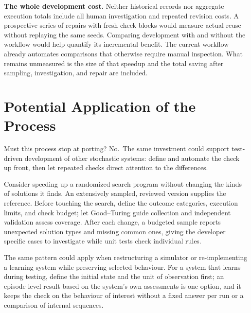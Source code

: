 \documentclass[10pt,letterpaper]{article}
\begin{document}
\textbf{The whole development cost.} Neither historical records nor aggregate execution
totals include all human investigation and repeated revision costs. A prospective series
of repairs with fresh check blocks would measure actual reuse without replaying the same
seeds. Comparing development with and without the workflow would help quantify its
incremental benefit. The current workflow already automates comparisons that otherwise
require manual inspection. What remains unmeasured is the size of that speedup and the
total saving after sampling, investigation, and repair are included.

\section{Potential Application of the Process}\label{sec:applications}

Must this process stop at porting? No.~The same investment could support test-driven
development of other stochastic systems: define and automate the check up front, then let
repeated checks direct attention to the differences.

Consider speeding up a randomized search program without changing the kinds of solutions
it finds. An extensively sampled, reviewed version supplies the reference. Before touching
the search, define the outcome categories, execution limits, and check budget; let
Good--Turing guide collection and independent validation assess coverage. After each
change, a budgeted sample reports unexpected solution types and missing common ones,
giving the developer specific cases to investigate while unit tests check individual
rules.

The same pattern could apply when restructuring a simulator or re-implementing a learning
system while preserving selected behaviour. For a system that learns during testing,
define the initial state and the unit of observation first; an episode-level result based
on the system's own assessments is one option, and it keeps the check on the behaviour of
interest without a fixed answer per run or a comparison of internal sequences.
\end{document}
